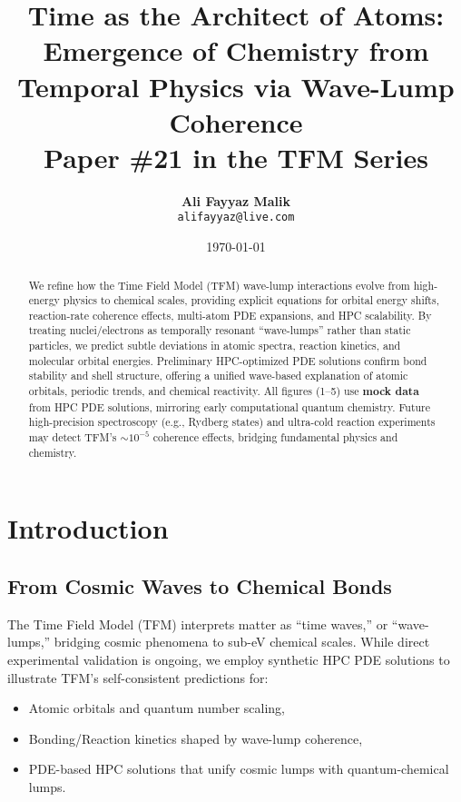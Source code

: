 \documentclass[12pt]{article}
\title{\textbf{Time as the Architect of Atoms: Emergence of Chemistry from Temporal Physics via Wave-Lump Coherence}\\
{\large Paper \#21 in the TFM Series}}
\author{\textbf{Ali Fayyaz Malik}\\
\texttt{alifayyaz@live.com}}
\date{\today}
\begin{document}
\maketitle

\begin{abstract}
We refine how the Time Field Model (TFM) wave-lump interactions evolve from high-energy physics to chemical scales, providing explicit equations for orbital energy shifts, reaction-rate coherence effects, multi-atom PDE expansions, and HPC scalability. By treating nuclei/electrons as temporally resonant “wave-lumps” rather than static particles, we predict subtle deviations in atomic spectra, reaction kinetics, and molecular orbital energies. Preliminary HPC-optimized PDE solutions confirm bond stability and shell structure, offering a unified wave-based explanation of atomic orbitals, periodic trends, and chemical reactivity. All figures (1--5) use \textbf{mock data} from HPC PDE solutions, mirroring early computational quantum chemistry. Future high-precision spectroscopy (e.g., Rydberg states) and ultra-cold reaction experiments may detect TFM’s \(\sim 10^{-5}\) coherence effects, bridging fundamental physics and chemistry.
\end{abstract}

\tableofcontents

\section{Introduction}
\label{sec:intro}

\subsection{From Cosmic Waves to Chemical Bonds}
The Time Field Model (TFM) interprets matter as “time waves,” or “wave-lumps,” bridging cosmic phenomena \cite{TFM13,TFM14,TFM15,TFM16} to sub-eV chemical scales. While direct experimental validation is ongoing, we employ synthetic HPC PDE solutions to illustrate TFM’s self-consistent predictions for:
\begin{itemize}
  \item Atomic orbitals and quantum number scaling,
  \item Bonding/Reaction kinetics shaped by wave-lump coherence,
  \item PDE-based HPC solutions that unify cosmic lumps with quantum-chemical lumps.
\end{itemize}
\end{document}
